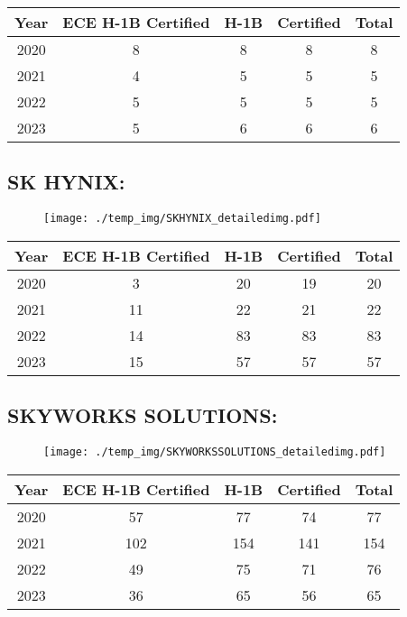 \documentclass{article}%
\begin{document}
%
\begin{longtable}{c|c|c|c|c}%
\hline%
Year&ECE H{-}1B Certified&H{-}1B&Certified&Total\\%
\hline%
2020&8&8&8&8\\%
\hline%
2021&4&5&5&5\\%
\hline%
2022&5&5&5&5\\%
\hline%
2023&5&6&6&6\\%
\hline%
\end{longtable}

%
\newpage%
\subsection{SK HYNIX:}%
\label{subsec:SKHYNIX}%
\label{SKHYNIXdetailed}%


\begin{figure}[htbp]%
\centering%
\texttt{[image: ./temp\_img/SKHYNIX\_detailedimg.pdf]}%
\end{figure}

%
\begin{longtable}{c|c|c|c|c}%
\hline%
Year&ECE H{-}1B Certified&H{-}1B&Certified&Total\\%
\hline%
2020&3&20&19&20\\%
\hline%
2021&11&22&21&22\\%
\hline%
2022&14&83&83&83\\%
\hline%
2023&15&57&57&57\\%
\hline%
\end{longtable}

%
\newpage%
\subsection{SKYWORKS SOLUTIONS:}%
\label{subsec:SKYWORKSSOLUTIONS}%
\label{SKYWORKSSOLUTIONSdetailed}%


\begin{figure}[htbp]%
\centering%
\texttt{[image: ./temp\_img/SKYWORKSSOLUTIONS\_detailedimg.pdf]}%
\end{figure}

%
\begin{longtable}{c|c|c|c|c}%
\hline%
Year&ECE H{-}1B Certified&H{-}1B&Certified&Total\\%
\hline%
2020&57&77&74&77\\%
\hline%
2021&102&154&141&154\\%
\hline%
2022&49&75&71&76\\%
\hline%
2023&36&65&56&65\\%
\hline%
\end{longtable}
\end{document}
